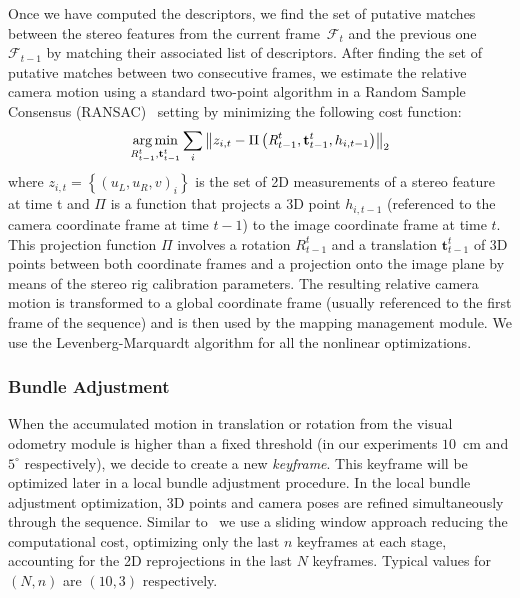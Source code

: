Once we have computed the descriptors, we find the set of putative matches between the stereo features from the current frame~$\mathcal{F}_{t}$ and the previous one~$\mathcal{F}_{t-1}$ by matching their associated list of descriptors. After finding the set of putative matches between two consecutive frames, we estimate the relative camera motion using a standard two-point algorithm in a Random Sample Consensus (RANSAC)~\cite{Bolles81ijcai} setting by minimizing the following cost function:
%
\begin{equation} \label{eq:three_pt}
\argmin_{\textit{R}_{t-1}^{t},\mathbf{t}_{t-1}^{t}} \sum\limits_{i} \left\| z_{i,t} - \Pi\left(\textit{R}_{t-1}^{t},\mathbf{t}_{t-1}^{t},h_{i,t-1}\right)\right\|_{2}
\end{equation}
%
where $z_{i,t}=\left\{\left(u_{L},u_{R},v\right)_{i}\right\}$ is the set of 2D measurements of a stereo feature at time t and $\Pi$ is a function that projects a 3D point $h_{i,t-1}$ (referenced to the camera coordinate frame at time $t-1$) to the image coordinate frame at time $t$. This projection function $\Pi$ involves a rotation $\textit{R}_{t-1}^{t}$ and a translation $\mathbf{t}_{t-1}^{t}$ of 3D
points between both coordinate frames and a projection onto the image plane by means of the stereo rig calibration parameters. The resulting relative camera motion is transformed to a global coordinate frame
(usually referenced to the first frame of the sequence) and is then used by the mapping management module. We use the Levenberg-Marquardt algorithm for all the nonlinear optimizations.

\subsubsection{Bundle Adjustment}\label{sec:ba}

When the accumulated motion in translation or rotation from the visual
odometry module is higher than a fixed threshold (in our experiments
$10$~cm and $5^{\circ}$ respectively), we decide to create a new
\textit{keyframe}. This keyframe will be optimized later in a local
bundle adjustment procedure. In the local bundle adjustment
optimization, 3D points and camera poses are refined simultaneously
through the sequence. Similar to~\cite{Mouragnon09ivc} we use a
sliding window approach reducing the computational cost, optimizing
only the last $n$ keyframes at each stage, accounting for the 2D
reprojections in the last $N$ keyframes. Typical values for
$\left(N,n\right)$ are $\left(10,3\right)$ respectively.

